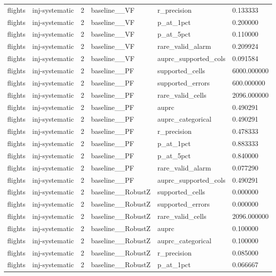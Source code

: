 \begin{tabular}{llllll}
flights & inj-systematic & 2 & baseline\_\_VF & r\_precision & 0.133333 \\
flights & inj-systematic & 2 & baseline\_\_VF & p\_at\_1pct & 0.200000 \\
flights & inj-systematic & 2 & baseline\_\_VF & p\_at\_5pct & 0.110000 \\
flights & inj-systematic & 2 & baseline\_\_VF & rare\_valid\_alarm & 0.209924 \\
flights & inj-systematic & 2 & baseline\_\_VF & auprc\_supported\_cols & 0.091584 \\
flights & inj-systematic & 2 & baseline\_\_PF & supported\_cells & 6000.000000 \\
flights & inj-systematic & 2 & baseline\_\_PF & supported\_errors & 600.000000 \\
flights & inj-systematic & 2 & baseline\_\_PF & rare\_valid\_cells & 2096.000000 \\
flights & inj-systematic & 2 & baseline\_\_PF & auprc & 0.490291 \\
flights & inj-systematic & 2 & baseline\_\_PF & auprc\_categorical & 0.490291 \\
flights & inj-systematic & 2 & baseline\_\_PF & r\_precision & 0.478333 \\
flights & inj-systematic & 2 & baseline\_\_PF & p\_at\_1pct & 0.883333 \\
flights & inj-systematic & 2 & baseline\_\_PF & p\_at\_5pct & 0.840000 \\
flights & inj-systematic & 2 & baseline\_\_PF & rare\_valid\_alarm & 0.077290 \\
flights & inj-systematic & 2 & baseline\_\_PF & auprc\_supported\_cols & 0.490291 \\
flights & inj-systematic & 2 & baseline\_\_RobustZ & supported\_cells & 0.000000 \\
flights & inj-systematic & 2 & baseline\_\_RobustZ & supported\_errors & 0.000000 \\
flights & inj-systematic & 2 & baseline\_\_RobustZ & rare\_valid\_cells & 2096.000000 \\
flights & inj-systematic & 2 & baseline\_\_RobustZ & auprc & 0.100000 \\
flights & inj-systematic & 2 & baseline\_\_RobustZ & auprc\_categorical & 0.100000 \\
flights & inj-systematic & 2 & baseline\_\_RobustZ & r\_precision & 0.085000 \\
flights & inj-systematic & 2 & baseline\_\_RobustZ & p\_at\_1pct & 0.066667 \\

\end{tabular}
